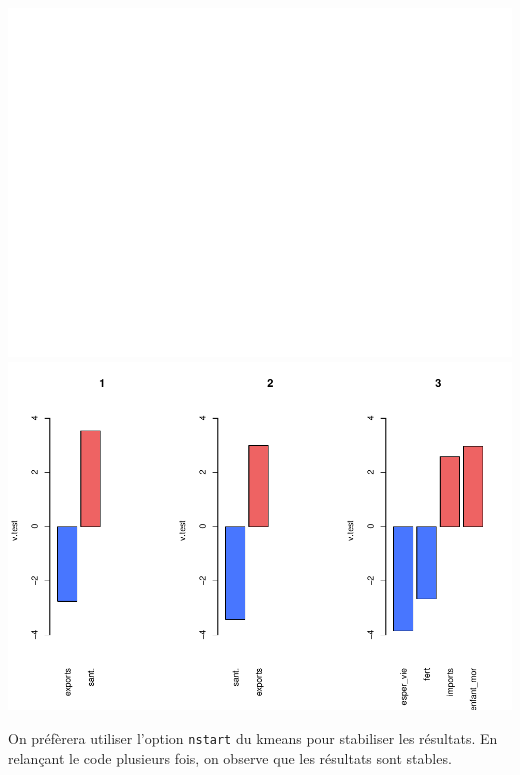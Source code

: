 \documentclass[
]{article}
\newenvironment{Shaded}{}{}
\newcommand{\AttributeTok}[1]{#1}
\newcommand{\DecValTok}[1]{#1}
\newcommand{\FunctionTok}[1]{#1}
\newcommand{\NormalTok}[1]{#1}
\newcommand{\OtherTok}[1]{\textcolor[rgb]{1.00,0.25,0.00}{#1}}
\newcommand{\SpecialCharTok}[1]{\textcolor[rgb]{0.00,0.50,0.50}{#1}}
\begin{document}
\includegraphics{Projet_files/figure-latex/unnamed-chunk-43-1.pdf}
\includegraphics{Projet_files/figure-latex/unnamed-chunk-43-2.pdf}

On préfèrera utiliser l'option \texttt{nstart} du kmeans pour stabiliser
les résultats. En relançant le code plusieurs fois, on observe que les
résultats sont stables.

\begin{Shaded}
\end{Shaded}
\end{document}
